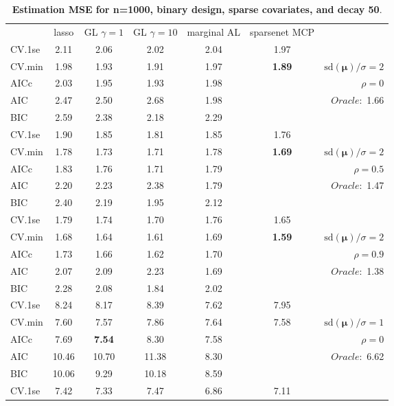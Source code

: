 \clearpage
\begin{table}\vspace{-.5cm}
\caption[l]{ { \bf Estimation MSE for n=1000, binary design, 
sparse covariates, and  decay  50}.}
\vspace{-.5cm}
\footnotesize{}
\begin{center}
\begin{tabular}{l*{5}{c}|r}
& lasso & GL $\gamma=1$ & GL $\gamma=10$ & marginal AL & sparsenet MCP  & \\
 \cline{1-7}
CV.1se & 2.11 & 2.06 & 2.02 & 2.04 & 1.97 & \\
CV.min & 1.98 & 1.93 & 1.91 & 1.97 & {\bf 1.89} &  $\mathrm{sd}(\mathbf{\mu})/\sigma=2$ \\
AICc & 2.03 & 1.95 & 1.93 & 1.98 & & $\rho=0$ \\
AIC & 2.47 & 2.50 & 2.68 & 1.98 & &  \multirow{2}{*}{$Oracle: $ 1.66} \\
BIC & 2.59 & 2.38 & 2.18 & 2.29 & &  \\
 \hline 
CV.1se & 1.90 & 1.85 & 1.81 & 1.85 & 1.76 & \\
CV.min & 1.78 & 1.73 & 1.71 & 1.78 & {\bf 1.69} &  $\mathrm{sd}(\mathbf{\mu})/\sigma=2$ \\
AICc & 1.83 & 1.76 & 1.71 & 1.79 & & $\rho=0.5$ \\
AIC & 2.20 & 2.23 & 2.38 & 1.79 & &  \multirow{2}{*}{$Oracle: $ 1.47} \\
BIC & 2.40 & 2.19 & 1.95 & 2.12 & &  \\
 \hline 
CV.1se & 1.79 & 1.74 & 1.70 & 1.76 & 1.65 & \\
CV.min & 1.68 & 1.64 & 1.61 & 1.69 & {\bf 1.59} &  $\mathrm{sd}(\mathbf{\mu})/\sigma=2$ \\
AICc & 1.73 & 1.66 & 1.62 & 1.70 & & $\rho=0.9$ \\
AIC & 2.07 & 2.09 & 2.23 & 1.69 & &  \multirow{2}{*}{$Oracle: $ 1.38} \\
BIC & 2.28 & 2.08 & 1.84 & 2.02 & &  \\
 \hline 
CV.1se & 8.24 & 8.17 & 8.39 & 7.62 & 7.95 & \\
CV.min & 7.60 & 7.57 & 7.86 & 7.64 & 7.58 &  $\mathrm{sd}(\mathbf{\mu})/\sigma=1$ \\
AICc & 7.69 & {\bf 7.54} & 8.30 & 7.58 & & $\rho=0$ \\
AIC & 10.46 & 10.70 & 11.38 & 8.30 & &  \multirow{2}{*}{$Oracle: $ 6.62} \\
BIC & 10.06 & 9.29 & 10.18 & 8.59 & &  \\
 \hline 
CV.1se & 7.42 & 7.33 & 7.47 & 6.86 & 7.11 & \\

\end{tabular}
\end{center}
\end{table}
